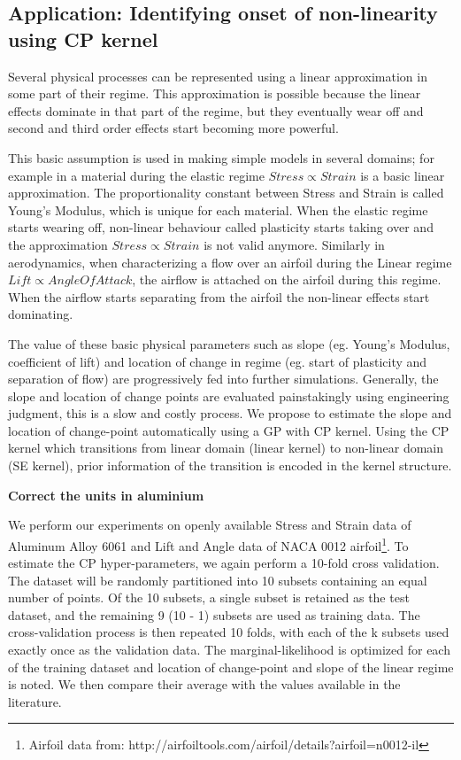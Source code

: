 \subsection{Application: Identifying onset of non-linearity  using CP kernel}\label{subsubsecCh4ApplicationCP}
Several physical processes can be represented using a linear approximation in some part of their regime. This approximation is possible because the linear effects dominate in that part of the regime, but they eventually wear off and second and third order effects start becoming more powerful. 

This basic assumption is used in making simple models in several domains; for example in a material during the elastic regime $Stress \propto Strain$ is a basic linear approximation. The proportionality constant between Stress and Strain is called Young's Modulus, which is unique for each material. When the elastic regime starts wearing off, non-linear behaviour called plasticity starts taking over and the approximation $Stress \propto Strain$ is not valid anymore. Similarly in aerodynamics, when characterizing a flow over an airfoil during the Linear regime  $ Lift \propto Angle Of Attack$, the airflow is attached on the airfoil during this regime. When the airflow starts separating from the airfoil the non-linear effects start dominating. 

\begin{mdframed}[hidealllines=true,backgroundcolor=blue!20]
The value of these basic physical parameters such as slope (eg. Young's Modulus, coefficient of lift) and location of change in regime (eg. start of plasticity and separation of flow) are progressively fed into further simulations. Generally, the slope and location of change points are evaluated painstakingly using engineering judgment, this is a slow and costly process. We propose to estimate the slope and location of change-point automatically using a GP with CP kernel. Using the CP kernel which transitions from linear domain (linear kernel) to non-linear domain (SE kernel), prior information of the transition is encoded in the kernel structure. 

\textbf{Correct the units in aluminium}

We perform our experiments on openly available Stress and Strain data of Aluminum Alloy 6061 \cite{kaufman1999properties} and Lift and Angle data of NACA 0012 airfoil\footnote{Airfoil data from: http://airfoiltools.com/airfoil/details?airfoil=n0012-il}. To estimate the CP hyper-parameters, we again perform a 10-fold cross validation. The dataset will be randomly partitioned into 10 subsets containing an equal number of points. Of the 10 subsets, a single subset is retained as the test dataset, and the remaining 9 (10 - 1) subsets are used as training data. The cross-validation process is then repeated 10 folds, with each of the k subsets used exactly once as the validation data. The marginal-likelihood is optimized for each of the training dataset and location of change-point and slope of the linear regime is noted. We then compare their average with the values available in the literature. 
\end{mdframed}


